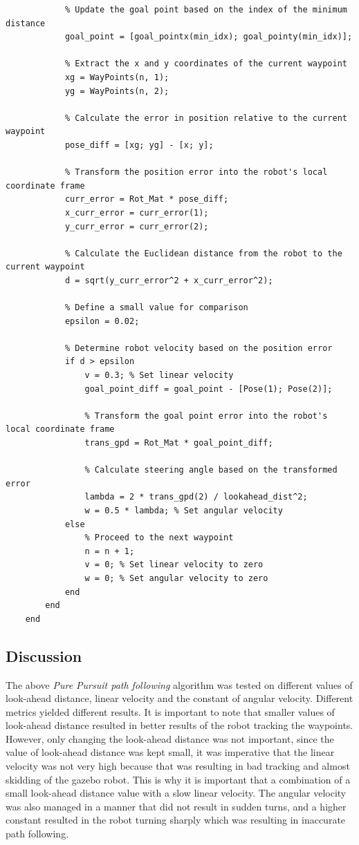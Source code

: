 \documentclass[answers]{exam}
\begin{document}
\begin{questions}
\begin{lstlisting}
            % Update the goal point based on the index of the minimum distance
            goal_point = [goal_pointx(min_idx); goal_pointy(min_idx)];
    
            % Extract the x and y coordinates of the current waypoint
            xg = WayPoints(n, 1);
            yg = WayPoints(n, 2);
            
            % Calculate the error in position relative to the current waypoint
            pose_diff = [xg; yg] - [x; y];
            
            % Transform the position error into the robot's local coordinate frame
            curr_error = Rot_Mat * pose_diff;
            x_curr_error = curr_error(1);
            y_curr_error = curr_error(2);
            
            % Calculate the Euclidean distance from the robot to the current waypoint
            d = sqrt(y_curr_error^2 + x_curr_error^2);
            
            % Define a small value for comparison
            epsilon = 0.02;
            
            % Determine robot velocity based on the position error
            if d > epsilon
                v = 0.3; % Set linear velocity
                goal_point_diff = goal_point - [Pose(1); Pose(2)];
                
                % Transform the goal point error into the robot's local coordinate frame
                trans_gpd = Rot_Mat * goal_point_diff;
                
                % Calculate steering angle based on the transformed error
                lambda = 2 * trans_gpd(2) / lookahead_dist^2;
                w = 0.5 * lambda; % Set angular velocity
            else
                % Proceed to the next waypoint
                n = n + 1;
                v = 0; % Set linear velocity to zero
                w = 0; % Set angular velocity to zero
            end
        end
    end
    \end{lstlisting}

    \subsection*{Discussion}
    The above \textit{Pure Pursuit path following} algorithm was tested on
    different values of look-ahead distance, linear velocity and the constant of
    angular velocity. Different metrics yielded different results. It is important
    to note that smaller values of look-ahead distance resulted in better results
    of the robot tracking the waypoints. However, only changing the look-ahead
    distance was not important, since the value of look-ahead distance was kept
    small, it was imperative that the linear velocity was not very high because
    that was resulting in bad tracking and almost skidding of the gazebo robot.
    This is why it is important that a combination of a small look-ahead distance
    value with a slow linear velocity. The angular velocity was also managed in a
    manner that did not result in sudden turns, and a higher constant resulted in
    the robot turning sharply which was resulting in inaccurate path following.


\end{questions}
\end{document}
